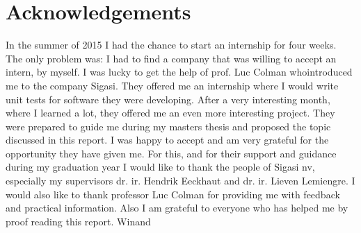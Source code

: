\chapter*{Acknowledgements}
In the summer of 2015 I had the chance to start an internship for four weeks. The only problem was: I had to find a company that was willing to accept an intern, by myself. I was lucky to get the help of prof. Luc Colman whointroduced me to the company Sigasi. They offered me an internship where I would write unit tests for software they were developing. After a very interesting month, where I learned a lot, they offered me an even more interesting project. They were prepared to guide me during my masters thesis and proposed the topic discussed in this report. I was happy to accept and am very grateful for the opportunity they have given me. For this, and for their support and guidance during my graduation year I would like to thank the people of Sigasi nv, especially my supervisors dr. ir. Hendrik Eeckhaut and dr. ir. Lieven Lemiengre.
\npar
I would also like to thank professor Luc Colman for providing me with feedback and practical information. Also I am grateful to everyone who has helped me by proof reading this report.
\npar
Winand